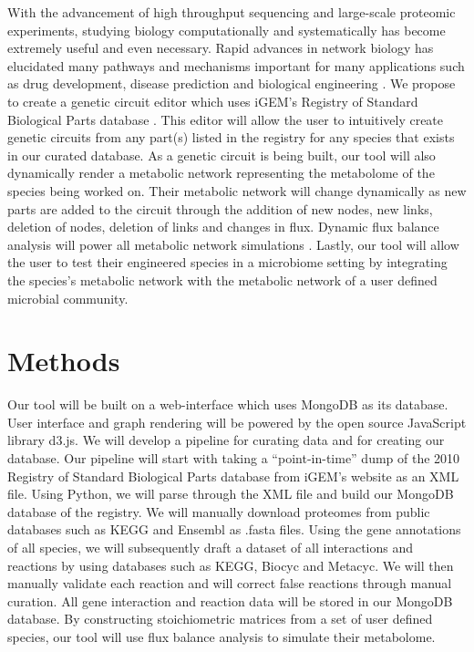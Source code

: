 With the advancement of high throughput sequencing and large-scale proteomic
experiments, studying biology computationally and systematically has become
extremely useful and even necessary. Rapid advances in network biology has
elucidated many pathways and mechanisms important for many applications such as
drug development, disease prediction and biological engineering \cite{dry01}. We
propose to create a genetic circuit editor which uses iGEM's Registry of
Standard Biological Parts database \cite{dry02}. This editor will allow the user
to intuitively create genetic circuits from any part(s) listed in the registry
for any species that exists in our curated database. As a genetic circuit is
being built, our tool will also dynamically render a metabolic network
representing the metabolome of the species being worked on. Their metabolic
network will change dynamically as new parts are added to the circuit through
the addition of new nodes, new links, deletion of nodes, deletion of links and
changes in flux. Dynamic flux balance analysis will power all metabolic network
simulations \cite{dry03}. Lastly, our tool will allow the user to test their
engineered species in a microbiome setting by integrating the species's
metabolic network with the metabolic network of a user defined microbial
community.

\section{Methods}

Our tool will be built on a web-interface which uses MongoDB as its database.
User interface and graph rendering will be powered by the open source JavaScript
library d3.js. We will develop a pipeline for curating data and for creating our
database. Our pipeline will start with taking a ``point-in-time'' dump of the
2010 Registry of Standard Biological Parts database from iGEM's website as an
XML file. Using Python, we will parse through the  XML file and build our
MongoDB database of the registry. We will manually download proteomes from
public databases such as KEGG and Ensembl as .fasta files. Using the gene
annotations of all species, we will subsequently draft a dataset of all
interactions and reactions by using databases such as KEGG, Biocyc and Metacyc.
We will then manually validate each reaction and will correct false reactions
through manual curation. All gene interaction and reaction data will be stored
in our MongoDB database. By constructing stoichiometric matrices from a set of
user defined species, our tool will use flux balance analysis to simulate their
metabolome.

